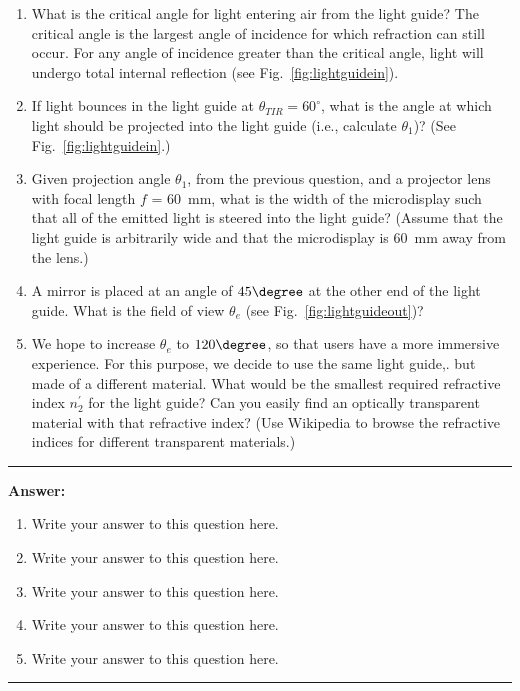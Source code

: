 \documentclass[conference]{styles/acmsiggraph}
\newenvironment{answer}{}{}
\newcommand{\pointsin}[1]{\normalfont{(\textit{#1pts})}}
\begin{document}
\begin{enumerate}[label=(\roman*)]
\item What is the critical angle for light entering air from the light guide? The critical angle is the largest angle of incidence for which refraction can still occur. For any angle of incidence greater than the critical angle, light will undergo total internal reflection (see Fig.~\ref{fig:lightguidein}). \pointsin{5}

\item If light bounces in the light guide at $\theta_{TIR} = 60^\circ$, what is the angle at which light should be projected into the light guide (i.e., calculate $\theta_1$)? (See Fig.~\ref{fig:lightguidein}.) \pointsin{5}

\item Given projection angle $\theta_1$, from the previous question, and a projector lens with focal length $f$ = 60~mm, what is the width of the microdisplay such that all of the emitted light is steered into the light guide? (Assume that the light guide is arbitrarily wide and that the microdisplay is 60~mm away from the lens.) \pointsin{5}

\item A mirror is placed at an angle of $45\degree$ at the other end of the light guide. What is the field of view $\theta_e$ (see Fig.~\ref{fig:lightguideout})? \pointsin{5}

\item We hope to increase $\theta_e$ to $120\degree$, so that users have a more immersive experience. For this purpose, we decide to use the same light guide,. but made of a different material. What would be the smallest required refractive index $n_2^\prime$ for the light guide? Can you easily find an optically transparent material with that refractive index? (Use Wikipedia to browse the refractive indices for different transparent materials.) \pointsin{5}
\end{enumerate}

\begin{answer}
\rule{\textwidth}{0.4pt}
\textbf{Answer:}
\begin{enumerate}[label=(\roman*)]
\item Write your answer to this question here.

\item Write your answer to this question here.

\item Write your answer to this question here.

\item Write your answer to this question here.

\item Write your answer to this question here.
\end{enumerate}
\rule{\textwidth}{0.4pt}
\end{answer}
\end{document}
